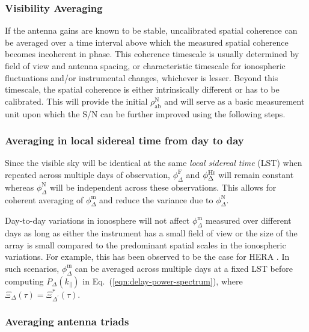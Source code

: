 \documentclass[
reprint,
superscriptaddress,
amsmath,
amssymb,
aps,
prd
]{revtex4-1}
\begin{document}
\subsubsection{Visibility Averaging}\label{sec:vis-avg}

If the antenna gains are known to be stable, uncalibrated spatial coherence can be averaged over a time interval above which the measured spatial coherence becomes incoherent in phase. This coherence timescale is usually determined by field of view and antenna spacing, or characteristic timescale for ionospheric fluctuations and/or instrumental changes, whichever is lesser. Beyond this timescale, the spatial coherence is either intrinsically different or has to be calibrated. This will provide the initial $\rho_\textrm{ab}^\textrm{N}$ and will serve as a basic measurement unit upon which the S/N can be further improved using the following steps. 

\subsubsection{Averaging in local sidereal time from day to day}\label{sec:lst-avg}

Since the visible sky will be identical at the same {\it local sidereal time} (LST) when repeated across multiple days of observation, $\phi_\Delta^\textrm{F}$ and $\phi_\Delta^\textrm{H{\sc i}}$ will remain constant whereas $\phi_\Delta^\textrm{N}$ will be independent across these observations. This allows for coherent averaging of $\phi_\Delta^\textrm{m}$ and reduce the variance due to $\phi_\Delta^\textrm{N}$.

Day-to-day variations in ionosphere will not affect $\phi_\Delta^\textrm{m}$ measured over different days as long as either the instrument has a small field of view or the size of the array is small compared to the predominant spatial scales in the ionospheric variations. For example, this has been observed to be the case for HERA \cite{car18}. In such scenarios, $\phi_\Delta^\textrm{m}$ can be averaged across multiple days at a fixed LST before computing $P_\Delta(k_\parallel)$ in Eq.~(\ref{eqn:delay-power-spectrum}), where $\Xi_\Delta(\tau)=\Xi_{\Delta^\prime}^*(\tau)$. 

\subsubsection{Averaging antenna triads}\label{sec:triad-avg}
\end{document}
